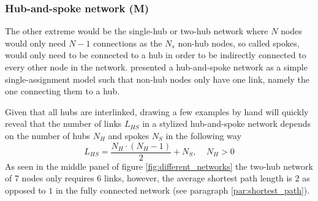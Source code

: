 \subsubsection{Hub-and-spoke network (M)}
The other extreme would be the single-hub or two-hub network where $N$ nodes would only need $N-1$ connections as the $N_s$ non-hub nodes, so called spokes, would only need to be connected to a hub in order to be indirectly connected to every other node in the network. \citet{o1987quadratic} presented a hub-and-spoke network as a simple single-assignment model such that non-hub nodes only have one link, namely the one connecting them to a hub.
\par
Given that all hubs are interlinked, drawing a few examples by hand will quickly reveal that the number of links $L_{HS}$ in a stylized hub-and-spoke network depends on the number of hubs $N_H$ and spokes $N_S$ in the following way
\begin{equation*}
  L_{HS}=\frac{N_H\cdot(N_H-1)}{2}+N_S,\ \ \ \ \ N_H>0
\end{equation*}
As seen in the middle panel of figure \ref{fig:different_networks} the two-hub network of 7 nodes only requires 6 links, however, the average shortest path length is $2$ as opposed to $1$ in the fully connected network (see paragraph \ref{par:shortest_path}).

